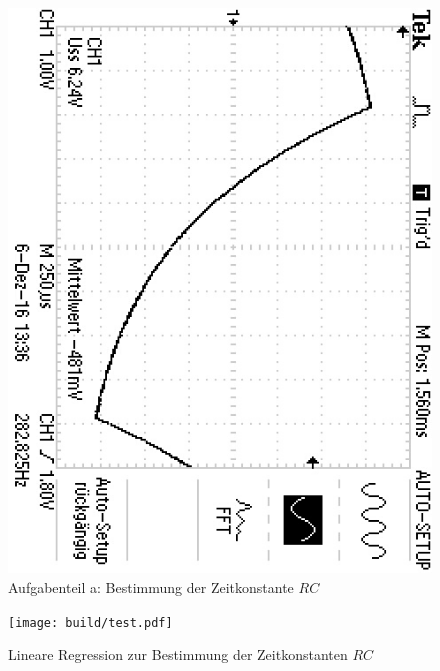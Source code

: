 \begin{figure}
	\centering
	\includegraphics[angle=90]{bilder/F0000TEK.JPG}
	\caption{Aufgabenteil a: Bestimmung der Zeitkonstante $RC$}
	\label{fig:plotrc}
\end{figure}

\begin{figure}
  \centering
  \texttt{[image: build/test.pdf]}
  \caption{Lineare Regression zur Bestimmung der Zeitkonstanten $RC$}
  \label{fig:plota}
\end{figure}


